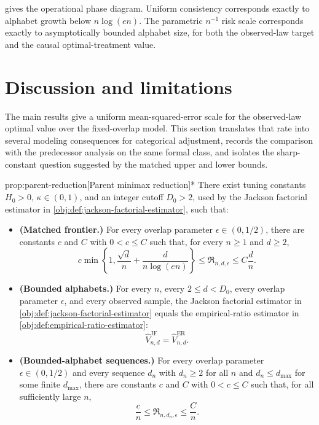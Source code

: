 \documentclass[11pt]{article}
\begin{document}
 gives the operational phase diagram. Uniform consistency corresponds exactly to alphabet growth below \(n\log(en)\). The parametric \(n^{-1}\) risk scale corresponds exactly to asymptotically bounded alphabet size, for both the observed-law target and the causal optimal-treatment value.


\section{Discussion and limitations}

The main results give a uniform mean-squared-error scale for the observed-law optimal value over the fixed-overlap model. This section translates that rate into several modeling consequences for categorical adjustment, records the comparison with the predecessor analysis on the same formal class, and isolates the sharp-constant question suggested by the matched upper and lower bounds.

\begin{propositionv}{prop:parent-reduction}[Parent minimax reduction]*
There exist tuning constants \(H_0>0\), \(\kappa\in(0,1)\), and an integer cutoff \(D_0>2\), used by the Jackson factorial estimator in \cref{obj:def:jackson-factorial-estimator}, such that:
\begin{itemize}
\item \textbf{(Matched frontier.)} For every overlap parameter \(\epsilon\in(0,1/2)\), there are constants \(c\) and \(C\) with \(0<c\leq C\) such that, for every \(n\geq1\) and \(d\geq2\),
\[
c\min\left\{1,\frac{\sqrt d}{n}+\frac{d}{n\log(en)}\right\}
\leq
\mathfrak R_{n,d,\epsilon}
\leq
C\frac{d}{n}.
\]
\item \textbf{(Bounded alphabets.)} For every \(n\), every \(2\leq d<D_0\), every overlap parameter \(\epsilon\), and every observed sample, the Jackson factorial estimator in \cref{obj:def:jackson-factorial-estimator} equals the empirical-ratio estimator in \cref{obj:def:empirical-ratio-estimator}:
\[
\widehat V_{n,d}^{\mathrm{JF}}=\widehat V_{n,d}^{\mathrm{ER}}.
\]
\item \textbf{(Bounded-alphabet sequences.)} For every overlap parameter \(\epsilon\in(0,1/2)\) and every sequence \(d_n\) with \(d_n\geq2\) for all \(n\) and \(d_n\leq d_{\max}\) for some finite \(d_{\max}\), there are constants \(c\) and \(C\) with \(0<c\leq C\) such that, for all sufficiently large \(n\),
\[
\frac{c}{n}
\leq
\mathfrak R_{n,d_n,\epsilon}
\leq
\frac{C}{n}.
\]
\end{itemize}
\end{propositionv}
\end{document}
